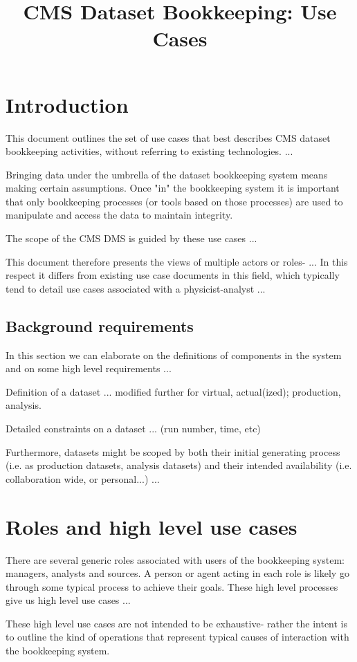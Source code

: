\documentclass{article}
\begin{document}
\title{CMS Dataset Bookkeeping: Use Cases}

\abstract{}


\section{Introduction}
This document outlines the set of use cases that best describes CMS dataset bookkeeping activities, without referring to existing technologies. ...

Bringing data under the umbrella of the dataset bookkeeping system means making certain assumptions. Once "in" the bookkeeping system it is important that only bookkeeping processes (or tools based on those processes) are used to manipulate and access the data to maintain integrity.

The scope of the CMS DMS is guided by these use cases ...

This document therefore presents the views of multiple actors or roles- ... In this respect it differs from existing use case documents in this field, which typically tend to detail use cases associated with a physicist-analyst ...

\subsection{Background requirements}
In this section we can elaborate on the definitions of components in the system and on some high level requirements ...

Definition of a dataset ... modified further for virtual, actual(ized); production, analysis.

Detailed constraints on a dataset ... (run number, time, etc)

Furthermore, datasets might be scoped by both their initial generating process (i.e. as production datasets, analysis datasets) and their intended availability (i.e. collaboration wide, or personal...) ...


\section{Roles and high level use cases}
There are several generic roles associated with users of the bookkeeping system: managers, analysts and sources. A person or agent acting in each role is likely go through some typical process to achieve their goals. These high level processes give us high level use cases ... 

These high level use cases are not intended to be exhaustive- rather the intent is to outline the kind of operations that represent typical causes of interaction with the bookkeeping system.
\end{document}
